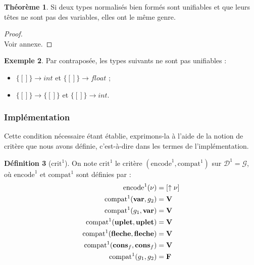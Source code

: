 \documentclass[a4paper]{report}
\newenvironment{preuve} 
  {\begin{proof}~\\} 
  {\end{proof}}
\theoremstyle{definition}
\newtheorem{theoreme}{Théorème}
\newtheorem{definition}[theoreme]{Définition}
\newtheorem{exemple}[theoreme]{Exemple}
\newcommand{\mset}[1]{\{\![#1]\!\}}
\newcommand{\G}{\mathscr{G}}
\begin{document}
\begin{theoreme} \label{thm_cond1}
  Si deux types normalisés bien formés sont unifiables et que leurs têtes ne sont pas des variables, elles ont le même genre.
\end{theoreme}

\begin{preuve}
	Voir annexe.
\end{preuve}

\begin{exemple}
  Par contraposée, les types suivants ne sont pas unifiables :
  \begin{itemize}
    \item $\mset{} \rightarrow int$ et $\mset{} \rightarrow float$ ;
    \item $\mset{} \rightarrow \mset{}$ et $\mset{} \rightarrow int$.
  \end{itemize}
\end{exemple}

\subsubsection{Implémentation}

Cette condition nécessaire étant établie, exprimons-la à l'aide de la notion de critère que nous avons définie, c'est-à-dire dans les termes de l'implémentation.

\begin{definition}[$\mathrm{crit}^1$]
  On note $\mathrm{crit}^1$ le critère $(\mathrm{encode}^1, \mathrm{compat}^1)$ sur $\mathscr{D}^1 = \G$, où $\mathrm{encode}^1$ et $\mathrm{compat}^1$ sont définies par :
  \begin{align*}
      \mathrm{encode}^1 (\nu) &=
      [ \uparrow \nu ]
    \\
      \mathrm{compat}^1 (\bold{var}, {g}_2) &=
      \bold{V}
    \\
      \mathrm{compat}^1 ({g}_1, \bold{var}) &=
      \bold{V}
    \\
      \mathrm{compat}^1 (\bold{uplet}, \bold{uplet}) &=
      \bold{V}
    \\
      \mathrm{compat}^1 (\bold{fleche}, \bold{fleche}) &=
      \bold{V}
    \\
      \mathrm{compat}^1 (\bold{cons}_f, \bold{cons}_f) &=
      \bold{V}
    \\
      \mathrm{compat}^1 ({g}_1, {g}_2) &=
      \bold{F}
  \end{align*}
\end{definition}
\end{document}
